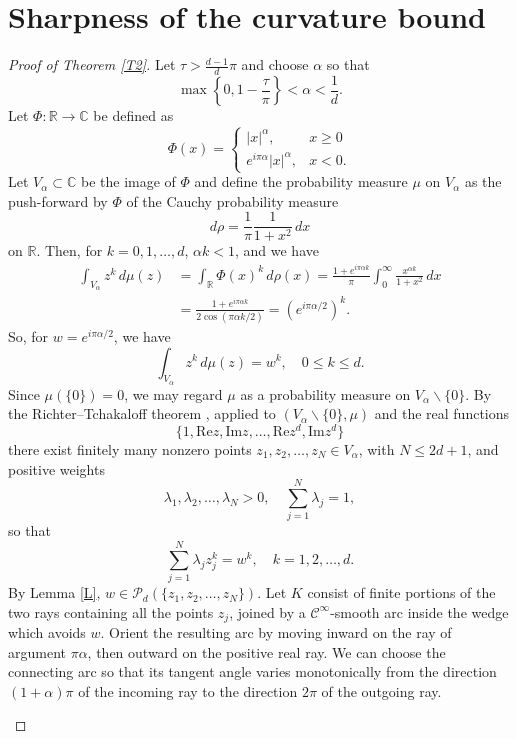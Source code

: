 \documentclass[reqno]{amsart}
\theoremstyle{definition}
\newcommand{\C}{\mathbb{C}}
\newcommand{\R}{\mathbb{R}}
\newcommand{\cC}{\mathcal{C}}
\newcommand{\cP}{\mathcal{P}}
\newcommand\Real{\mathrm{Re}}
\newcommand\Imag{\mathrm{Im}}
\numberwithin{equation}{section}
\begin{document}
\section{Sharpness of the curvature bound}

\begin{proof}[Proof of Theorem \ref{T2}] Let $\tau>\frac{d-1}{d}\pi$ and choose $\alpha$ so that
\[\max\left\{0,1-\frac{\tau}{\pi}\right\}<\alpha<\frac1d.\]
Let $\Phi:\R\to \C$ be defined as 
\[
\Phi(x)=\begin{cases}
    |x|^\alpha ,&x\ge 0 \\
    e^{i\pi\alpha}|x|^\alpha ,& x < 0.
\end{cases}
\]
Let $V_{\alpha}\subset\C$ be the image of $\Phi$ and  	
define the probability measure $\mu$ on $V_{\alpha}$ as the push-forward by $\Phi$ of the Cauchy probability measure 
\[d\rho=\frac{1}{\pi}\frac{1}{1+x^2}\,dx\]
on $\R$. Then, for $k=0,1,\ldots, d$, $\alpha k<1$, and we have 
\begin{align*} \int_{V_\alpha}z^k\,d\mu (z)&=\int_{\R}\Phi(x)^k\,d\rho(x)=\frac{1+e^{i\pi\alpha k}}{\pi}\int_0^\infty \frac{x^{\alpha k}}{1+x^2}\,dx\\
    &=\frac{1+e^{i\pi \alpha k}}{2\cos(\pi\alpha k/2)}=(e^{i\pi\alpha/2})^k.
\end{align*}
So, for $w=e^{i\pi\alpha/2}$, we have
\[\int_{V_\alpha}z^k\,d\mu (z)=w^k,\quad 0\le k\le d.\]
Since $\mu(\{0\})=0$, we may regard $\mu$ as a probability measure on $V_\alpha\backslash\{0\}$. By the Richter--Tchakaloff theorem \cite{R,T}, applied to $(V_{\alpha}\backslash\{0\},\mu)$ and the real functions 
\[\{1,\Real z,\Imag z,\ldots,\Real z^d,\Imag z^d\}\]
there exist finitely many nonzero points $z_1,z_2,\ldots,z_N\in V_{\alpha}$, with $N\le 2d+1$, and positive weights \[\lambda_1,\lambda_2,\ldots,\lambda_N>0,\quad \sum_{j=1}^{N}\lambda_j=1,\]
so that 
\[\sum_{j=1}^N\lambda_jz_j^k=w^k,\quad k=1,2,\ldots,d.\] 
By Lemma \ref{L}, $w\in\cP_d (\{z_1,z_2,\ldots,z_N\})$.
Let $K$ consist of finite portions of the two rays containing all the points $z_j$, joined by a $\cC^{\infty}$-smooth arc inside the wedge which avoids $w$. Orient the resulting arc by moving inward on the ray of argument $\pi\alpha$, then outward on the positive real ray. We can choose the connecting arc so that its tangent angle varies monotonically from the direction $(1+\alpha)\pi$ of the incoming ray to the direction $2\pi$ of the outgoing ray. 

\begin{figure}[H]
\begin{center}\begin{tikzpicture}[
    scale=0.6,
    every node/.style={font=\small},
    point/.style={circle,fill=black,inner sep=2pt},
    contour/.style={line width=1.3pt},
]


\end{tikzpicture}
\end{center}
\end{figure}
\end{proof}
\end{document}
